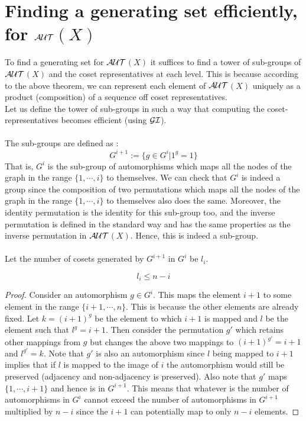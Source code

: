 \section{Finding a generating set efficiently, for $\cal{AUT}$$(X)$}
To find a generating set for $\cal{AUT}$$(X)$ it suffices to find a tower of sub-groups of $\cal{AUT}$$(X)$ and the 
coset representatives at each level. This is because according to the above theorem, we can represent each element of $\cal{AUT}$$(X)$ uniquely as a product (composition) of a sequence off coset representatives.\\
Let us define the tower of sub-groups in such a way that computing the coset-representatives becomes efficient (using $\cal{GI}$).\\\\
The sub-groups are defined as :
$$G^{i+1} := \{ g \in G^{i} | 1^{g} = 1\}$$
That is, $G^{i}$ is the sub-group of automorphisms which maps all the nodes of the graph in the range $\{1, \cdots, i\}$ to themselves. We can check that $G^{i}$ is indeed a group since the composition of two permutations which maps all the nodes of the graph in the range $\{1, \cdots, i\}$ to themselves also does the same. Moreover, the identity permutation is the identity for this sub-group too, and the inverse permutation is defined in the standard way and has the same properties as the inverse permutation in $\cal{AUT}$$(X)$. Hence, this is indeed a sub-group.\\\\
Let the number of cosets generated by $G^{i+1}$ in $G^{i}$ be $l_{i}$.
\begin{claim}
$$l_{i} \le n-i$$\end{claim}
\begin{proof}
Consider an automorphism $g \in G^{i}$. This maps the element $i+1$ to some element in the range $\{i+1, \cdots, n\}$. This is because the other elements are already fixed. Let $k = (i+1)^{g}$ be the element to which $i+1$ is mapped and $l$ be the element such that $l^{g}= i+1$. Then consider the permutation $g'$ which retains other mappings from $g$ but changes the above two mappings to $(i+1)^{g'} = i+1$ and $l^{g'} = k$. Note that $g'$ is also an automorphism since $l$ being mapped to $i+1$ implies that if $l$ is mapped to the image of $i$ the automorphism would still be preserved (adjacency and non-adjacency is preserved). Also note that $g'$ maps $\{1, \cdots , i+1\}$ and hence is in $G^{i+1}$. This means that whatever is the number of automorphisms in $G^{i}$ cannot exceed the number of automorphisms in $G^{i+1}$ multiplied by $n-i$ since the $i+1$ can potentially map to only $n-i$ elements.
\end{proof}\\
